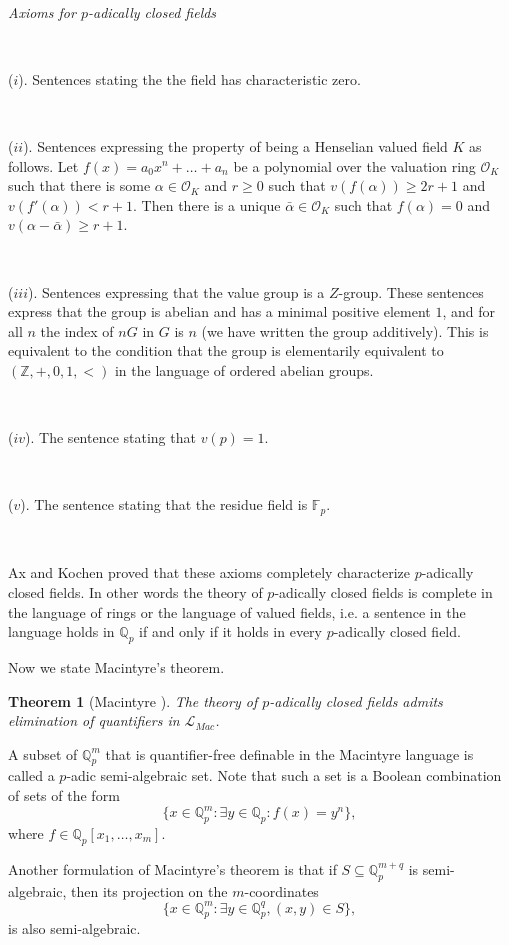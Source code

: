 \documentclass[12pt]{amsart}
\def\F{\mathbb{F}}
\def\Z{\mathbb{Z}}
\def\cL{\mathcal{L}}
\def\Q{\mathbb{Q}}
\def\F{\mathbb{F}}
\def\cL{\mathcal{L}}
\def\cO{\mathcal{O}}
\newtheorem{thm}{Theorem}[section]
\numberwithin{equation}{section}
\begin{document}
\

{\it Axioms for $p$-adically closed fields}

\

($i$). Sentences stating the the field has characteristic zero. 

\

($ii$). Sentences expressing the property of being a Henselian valued field $K$ as follows. Let
$f(x)=a_0x^n+\dots+a_n$ be a polynomial over the valuation ring $\cO_K$ such that 
there is some $\alpha \in \cO_K$ and $r\geq 0$ such that $v(f(\alpha))\geq 2r+1$ and $v(f'(\alpha))<r+1$. 
Then there is a unique $\bar{\alpha}\in \cO_K$ such that $f(\alpha)=0$ and $v(\alpha - \bar{\alpha}) \geq r+1$.   

\

($iii$). Sentences expressing that the value group is a $Z$-group. These sentences express that the group is abelian and has a minimal positive element $1$, and for all $n$ the index of $nG$ in $G$ is $n$ (we have written the group additively). This is equivalent to the condition that the group is elementarily equivalent to $(\Z,+,0,1,<)$ in the language of ordered abelian groups.

\

($iv$). The sentence stating that $v(p)=1$.

\

($v$). The sentence stating that the residue field is $\F_p$.

\

Ax and Kochen \cite{AK2} proved that these axioms completely characterize $p$-adically closed fields. In other words the 
theory of $p$-adically closed fields is complete in the language of rings or the language of valued fields, i.e. 
a sentence in the language holds in $\Q_p$ if and only if it holds in every $p$-adically closed field. 

Now we state Macintyre's theorem.

\begin{thm}[Macintyre \cite{Macintyre1}]\label{mac-thm} The theory of $p$-adically closed fields admits elimination of quantifiers in $\cL_{Mac}$.\end{thm}

A subset of $\Q_p^m$ that is quantifier-free definable in the Macintyre language is called a $p$-adic semi-algebraic set. Note that such a set is a Boolean combination of sets of the form 
$$\{x\in \Q_p^m: \exists y\in \Q_p: f(x)=y^n\},$$
where $f\in \Q_p[x_1,\dots,x_m]$.

Another formulation of Macintyre's theorem is that if $S\subseteq \Q_p^{m+q}$ is semi-algebraic, then 
its projection on the $m$-coordinates
$$\{x\in \Q_p^m: \exists y\in \Q_p^q, (x,y)\in S\},$$
is also semi-algebraic.
\end{document}
